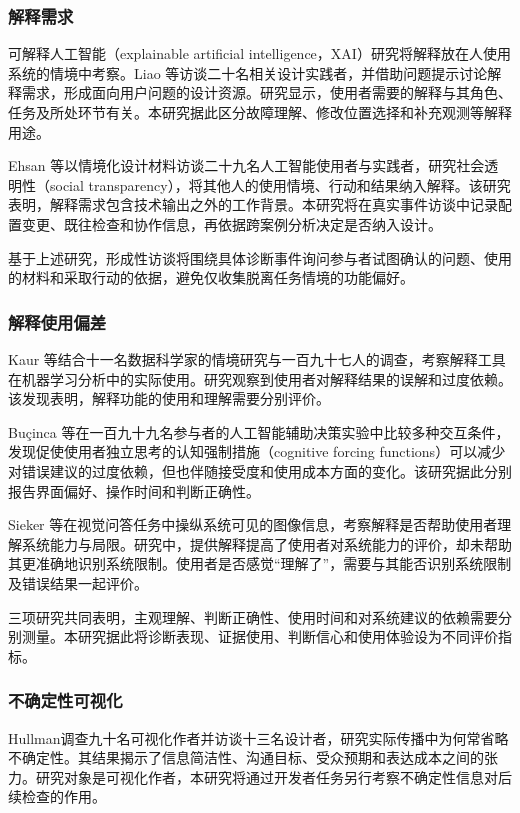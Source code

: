 \subsubsection{解释需求}

可解释人工智能（explainable artificial intelligence，XAI）研究将解释放在人使用系统的情境中考察。Liao 等\cite{ref49}访谈二十名相关设计实践者，并借助问题提示讨论解释需求，形成面向用户问题的设计资源。研究显示，使用者需要的解释与其角色、任务及所处环节有关。本研究据此区分故障理解、修改位置选择和补充观测等解释用途。

Ehsan 等\cite{ref51}以情境化设计材料访谈二十九名人工智能使用者与实践者，研究社会透明性（social transparency），将其他人的使用情境、行动和结果纳入解释。该研究表明，解释需求包含技术输出之外的工作背景。本研究将在真实事件访谈中记录配置变更、既往检查和协作信息，再依据跨案例分析决定是否纳入设计。

基于上述研究，形成性访谈将围绕具体诊断事件询问参与者试图确认的问题、使用的材料和采取行动的依据，避免仅收集脱离任务情境的功能偏好。

\subsubsection{解释使用偏差}

Kaur 等\cite{ref50}结合十一名数据科学家的情境研究与一百九十七人的调查，考察解释工具在机器学习分析中的实际使用。研究观察到使用者对解释结果的误解和过度依赖。该发现表明，解释功能的使用和理解需要分别评价。

Buçinca 等\cite{ref55}在一百九十九名参与者的人工智能辅助决策实验中比较多种交互条件，发现促使使用者独立思考的认知强制措施（cognitive forcing functions）可以减少对错误建议的过度依赖，但也伴随接受度和使用成本方面的变化。该研究据此分别报告界面偏好、操作时间和判断正确性。

Sieker 等\cite{ref56}在视觉问答任务中操纵系统可见的图像信息，考察解释是否帮助使用者理解系统能力与局限。研究中，提供解释提高了使用者对系统能力的评价，却未帮助其更准确地识别系统限制。使用者是否感觉“理解了”，需要与其能否识别系统限制及错误结果一起评价。

三项研究共同表明，主观理解、判断正确性、使用时间和对系统建议的依赖需要分别测量。本研究据此将诊断表现、证据使用、判断信心和使用体验设为不同评价指标。

\subsubsection{不确定性可视化}

Hullman\cite{ref40}调查九十名可视化作者并访谈十三名设计者，研究实际传播中为何常省略不确定性。其结果揭示了信息简洁性、沟通目标、受众预期和表达成本之间的张力。研究对象是可视化作者，本研究将通过开发者任务另行考察不确定性信息对后续检查的作用。

